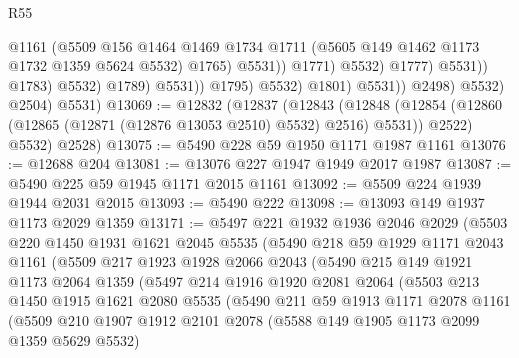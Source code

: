 \begin{lexlean}{R55}
\begin{coremodule}
                                              @1161
                                              (@5509
                                                @156
                                                @1464
                                                @1469
                                                @1734
                                                @1711
                                                (@5605 @149 @1462 @1173 @1732 @1359 @5624 @5532)
                                                @1765)
                                              @5531))
                                          @1771)
                                        @5532)
                                      @1777)
                                    @5531))
                                @1783)
                              @5532)
                            @1789)
                          @5531))
                      @1795)
                    @5532)
                  @1801)
                @5531))
            @2498)
          @5532)
        @2504)
      @5531)
@13069 := @12832
    (@12837
      (@12843
        (@12848 (@12854 (@12860 (@12865 (@12871 (@12876 @13053 @2510) @5532) @2516) @5531)) @2522)
        @5532)
      @2528)
@13075 := @5490 @228 @59 @1950 @1171 @1987 @1161
@13076 := @12688 @204
@13081 := @13076 @227 @1947 @1949 @2017 @1987
@13087 := @5490 @225 @59 @1945 @1171 @2015 @1161
@13092 := @5509 @224 @1939 @1944 @2031 @2015
@13093 := @5490 @222
@13098 := @13093 @149 @1937 @1173 @2029 @1359
@13171 := @5497
    @221
    @1932
    @1936
    @2046
    @2029
    (@5503
      @220
      @1450
      @1931
      @1621
      @2045
      @5535
      (@5490
        @218
        @59
        @1929
        @1171
        @2043
        @1161
        (@5509
          @217
          @1923
          @1928
          @2066
          @2043
          (@5490
            @215
            @149
            @1921
            @1173
            @2064
            @1359
            (@5497
              @214
              @1916
              @1920
              @2081
              @2064
              (@5503
                @213
                @1450
                @1915
                @1621
                @2080
                @5535
                (@5490
                  @211
                  @59
                  @1913
                  @1171
                  @2078
                  @1161
                  (@5509
                    @210
                    @1907
                    @1912
                    @2101
                    @2078
                    (@5588 @149 @1905 @1173 @2099 @1359 @5629 @5532)

\end{coremodule}
\end{lexlean}
